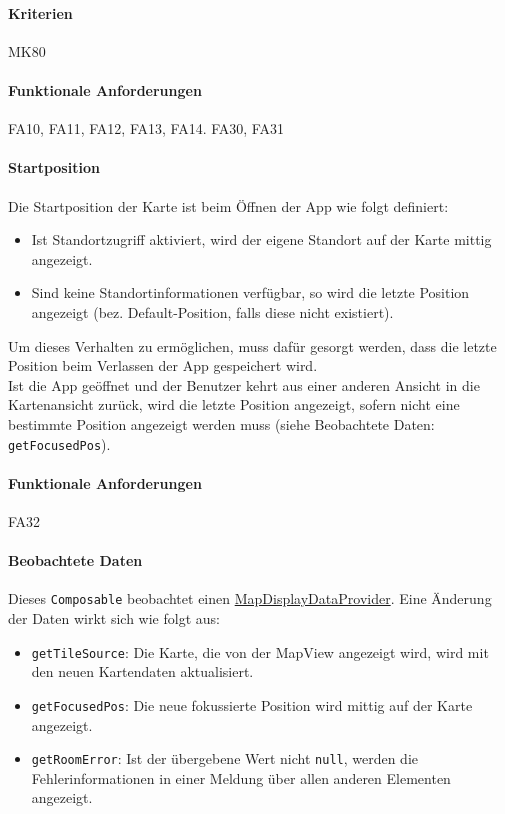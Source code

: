 \paragraph{Kriterien}
MK80
\paragraph{Funktionale Anforderungen}
FA10, FA11, FA12, FA13, FA14. FA30, FA31

\paragraph*{Startposition}
Die Startposition der Karte ist beim Öffnen der App wie folgt definiert:
\begin{itemize}
    \item Ist Standortzugriff aktiviert, wird der eigene Standort auf der Karte mittig angezeigt.
    \item Sind keine Standortinformationen verfügbar, so wird die letzte Position angezeigt 
    (bez. Default-Position, falls diese nicht existiert).
\end{itemize}
Um dieses Verhalten zu ermöglichen, muss dafür gesorgt werden, dass die letzte Position beim Verlassen 
der App gespeichert wird.\\
Ist die App geöffnet und der Benutzer kehrt aus einer anderen Ansicht in die \Gls{Kartenansicht} zurück,
wird die letzte Position angezeigt, sofern nicht eine bestimmte Position angezeigt werden muss 
(siehe Beobachtete Daten: \texttt{getFocusedPos}).
\paragraph{Funktionale Anforderungen}
FA32

\paragraph*{Beobachtete Daten}
Dieses \texttt{Composable} beobachtet einen \hyperref[App_Map_ViewModel_MapDisplayDataProvider]{MapDisplayDataProvider}. 
Eine Änderung der Daten wirkt sich wie folgt aus:
\begin{itemize}
    \item \texttt{getTileSource}: Die Karte, die von der MapView angezeigt wird, wird mit den neuen 
    Kartendaten aktualisiert.
    \item \texttt{getFocusedPos}: Die neue fokussierte Position wird mittig auf der Karte angezeigt.
    \item \texttt{getRoomError}: Ist der übergebene Wert nicht \texttt{null}, werden die Fehlerinformationen 
    in einer Meldung über allen anderen Elementen angezeigt.
\end{itemize}

